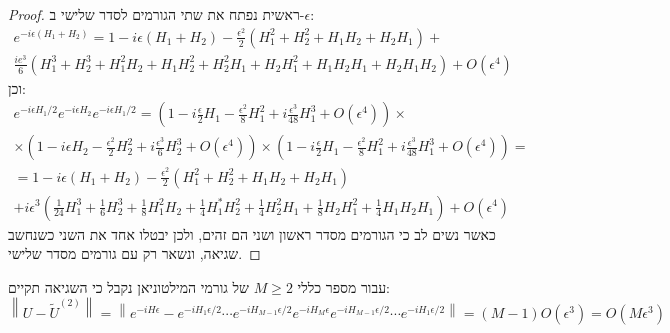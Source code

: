 \documentclass{tstextbook}
\begin{document}
\begin{proof}
ראשית נפתח את שתי הגורמים לסדר שלישי ב-\(\epsilon\):
\begin{gather*}e^{-i\epsilon(H_{1}+H_{2})}=1-i\epsilon\left(H_{1}+H_{2}\right)-\frac{\epsilon^{2}}{2}\left(H_{1}^{2}+H_{2}^{2}+H_{1}H_{2}+H_{2}H_{1}\right)+\\ \frac{ie^{3}}{6}\left(H_{1}^{3}+H_{2}^{3}+H_{1}^{2}H_{2}+H_{1}H_{2}^{2}+H_{2}^{2}H_{1}+H_{2}H_{1}^{2}+H_{1}H_{2}H_{1}+H_{2}H_{1}H_{2}\right)+O\left(\epsilon^{4}\right) 
\end{gather*}
וכן:
\begin{gather*}e^{-i\epsilon H_{1}/2}e^{-i\epsilon H_{2}}e^{-i\epsilon H_{1}/2}=\left(1-i\frac{\epsilon}{2}H_{1}-\frac{\epsilon^{2}}{8}H_{1}^{2}+i\frac{\epsilon^{3}}{48}H_{1}^{3}+O\left(\epsilon^{4}\right)\right)\times\\ \times\left(1-i\epsilon H_{2}-\frac{\epsilon^{2}}{2}H_{2}^{2}+i\frac{\epsilon^{3}}{6}H_{2}^{3}+O\left(\epsilon^{4}\right)\right)\times\left(1-i\frac{\epsilon}{2}H_{1}-\frac{\epsilon^{2}}{8}H_{1}^{2}+i\frac{\epsilon^{3}}{48}H_{1}^{3}+O\left(\epsilon^{4}\right)\right)=\\=1-i\epsilon\left(H_{1}+H_{2}\right)-\frac{\epsilon^{2}}{2}\left(H_{1}^{2}+H_{2}^{2}+H_{1}H_{2}+H_{2}H_{1}\right)\\+i\epsilon^{3}\left(\frac{1}{24}H_{1}^{3}+\frac{1}{6}H_{2}^{3}+\frac{1}{8}H_{1}^{2}H_{2}+\frac{1}{4}H_{1}^{*}H_{2}^{2}+\frac{1}{4}H_{2}^{2}H_{1}+\frac{1}{8}H_{2}H_{1}^{2}+\frac{1}{4}H_{1}H_{2}H_{1}\right)+O\left(\epsilon^{4}\right) 
\end{gather*}
כאשר נשים לב כי הגורמים מסדר ראשון ושני הם זהים, ולכן יבטלו אחד את השני כשנחשב שגיאה, ונשאר רק עם גורמים מסדר שלישי.

\end{proof}
\begin{proposition}
עבור מספר כללי \(M\geq 2\) של גורמי המילטוניאן נקבל כי השגיאה תקיים:
$$\left\lVert  U-\widetilde{U}^{(2)}  \right\rVert =\left\|e^{-iH\epsilon}-e^{-iH_{1}\epsilon/2}\cdots e^{-iH_{M-1}\epsilon/2}e^{-iH_{M}\epsilon}e^{-iH_{M-1}\epsilon/2}\cdots e^{-iH_{1}\epsilon/2}\right\|=\left(M-1\right)O\left(\epsilon^{3}\right)=O\left(M\epsilon^{3}\right)$$

\end{proposition}
\end{document}
